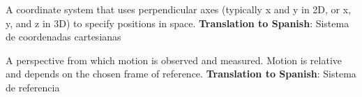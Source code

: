 \begin{vocabulary}
A coordinate system that uses perpendicular axes (typically x and y in 2D, or x, y, and z in 3D) to specify positions in space. \newline
\textbf{Translation to Spanish}: Sistema de coordenadas cartesianas \newline
\end{vocabulary}

\begin{vocabulary}
A perspective from which motion is observed and measured. Motion is relative and depends on the chosen frame of reference. \newline
\textbf{Translation to Spanish}: Sistema de referencia \newline
\end{vocabulary}


%



